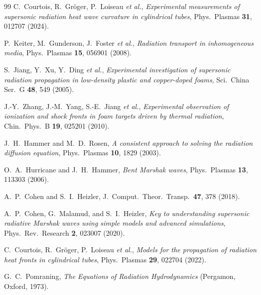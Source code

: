 \documentclass[prl, twocolumn, superscriptaddress, amsmath, amssymb, reprint]{revtex4-2}
\begin{document}
\begin{thebibliography}{99}
C.~Courtois, R.~Gr\"oger, P.~Loiseau \textit{et al.},
\textit{Experimental measurements of supersonic radiation heat wave curvature in cylindrical tubes},
Phys.\ Plasmas \textbf{31}, 012707 (2024).

P.~Keiter, M.~Gunderson, J.~Foster \textit{et al.},
\textit{Radiation transport in inhomogeneous media},
Phys.\ Plasmas \textbf{15}, 056901 (2008).

S.~Jiang, Y.~Xu, Y.~Ding \textit{et al.},
\textit{Experimental investigation of supersonic radiation propagation in low-density plastic and copper-doped foams},
Sci.\ China Ser.\ G \textbf{48}, 549 (2005).

J.-Y.~Zhang, J.-M.~Yang, S.-E.~Jiang \textit{et al.},
\textit{Experimental observation of ionization and shock fronts in foam targets driven by thermal radiation},
Chin.\ Phys.\ B \textbf{19}, 025201 (2010).

J.~H.~Hammer and M.~D.~Rosen,
\textit{A consistent approach to solving the radiation diffusion equation},
Phys.\ Plasmas \textbf{10}, 1829 (2003).

O.~A.~Hurricane and J.~H.~Hammer,
\textit{Bent Marshak waves},
Phys.\ Plasmas \textbf{13}, 113303 (2006).

A.~P.~Cohen and S.~I.~Heizler,
J.\ Comput.\ Theor.\ Transp.\ \textbf{47}, 378 (2018).

A.~P.~Cohen, G.~Malamud, and S.~I.~Heizler,
\textit{Key to understanding supersonic radiative Marshak waves using simple models and advanced simulations},
Phys.\ Rev.\ Research \textbf{2}, 023007 (2020).

C.~Courtois, R.~Gr\"oger, P.~Loiseau \textit{et al.},
\textit{Models for the propagation of radiation heat fronts in cylindrical tubes},
Phys.\ Plasmas \textbf{29}, 022704 (2022).


G.~C.~Pomraning,
\textit{The Equations of Radiation Hydrodynamics}
(Pergamon, Oxford, 1973).


\end{thebibliography}
\end{document}
